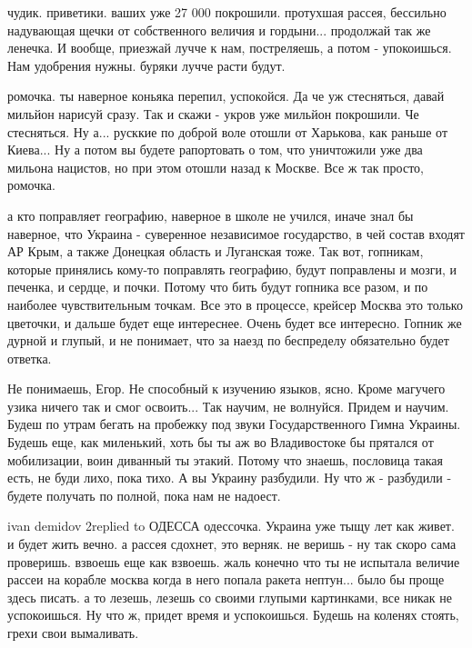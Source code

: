 чудик. приветики. ваших уже 27 000 покрошили. протухшая рассея, бессильно
надувающая щечки от собственного величия и гордыни... продолжай так же ленечка.
И вообще, приезжай лучче к нам, постреляешь, а потом - упокоишься. Нам
удобрения нужны. буряки лучче расти будут.

ромочка. ты наверное коньяка перепил, успокойся. Да че уж стесняться, давай
мильйон нарисуй сразу. Так и скажи - укров уже мильйон покрошили. Че
стесняться. Ну а... русккие по доброй воле отошли от Харькова, как раньше от
Киева... Ну а потом вы будете рапортовать о том, что уничтожили уже два мильона
нацистов, но при этом отошли назад к Москве. Все ж так просто, ромочка.

а кто поправляет географию, наверное в школе не учился, иначе знал бы наверное,
что Украина - суверенное независимое государство, в чей состав входят АР Крым,
а также Донецкая область и Луганская тоже. Так вот, гопникам, которые принялись
кому-то поправлять географию, будут поправлены и мозги, и печенка, и сердце, и
почки. Потому что бить будут гопника все разом, и по наиболее чувствительным
точкам. Все это в процессе, крейсер Москва это только цветочки, и дальше будет
еще интереснее. Очень будет все интересно. Гопник же дурной и глупый, и не
понимает, что за наезд по беспределу обязательно будет ответка.

Не понимаешь, Егор. Не способный к изучению языков, ясно. Кроме магучего узика
ничего так и смог освоить... Так научим, не волнуйся. Придем и научим. Будеш по
утрам бегать на пробежку под звуки Государственного Гимна Украины. Будешь еще,
как миленький, хоть бы ты аж во Владивостоке бы прятался от мобилизации, воин
диванный ты этакий. Потому что знаешь, пословица такая есть, не буди лихо, пока
тихо. А вы Украину разбудили. Ну что ж - разбудили - будете получать по полной,
пока нам не надоест.

ivan demidov 2replied to ОДЕССА
одессочка. Украина уже тыщу лет как живет. и будет жить вечно. а рассея
сдохнет, это верняк. не веришь - ну так скоро сама проверишь. взвоешь еще как
взвоешь. жаль конечно что ты не испытала величие рассеи на корабле москва когда
в него попала ракета нептун... было бы проще здесь писать. а то лезешь, лезешь
со своими глупыми картинками, все никак не успокоишься. Ну что ж, придет время
и успокоишься. Будешь на коленях стоять, грехи свои вымаливать.

